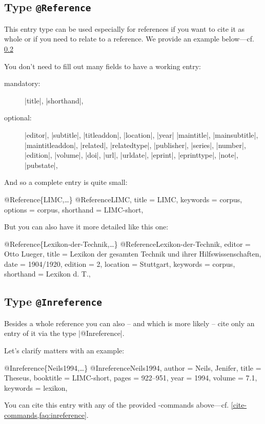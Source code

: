 \documentclass[a4paper,
10pt,
greek,
french,
spanish,
italian,
ngerman,
english
]{ltxdoc}
\begin{document}
 \subsection{Type \texttt{@Reference}}\label{reference}
 This entry type can be used especially for references if you want to cite it as whole or if you need to relate to a reference. 
We provide an example below---cf. \cref{inreference}

You don’t need to fill out many fields to have a working entry:
\begin{description}
\item[mandatory:] |title|, |shorthand|,
\item[optional:] 
 |editor|, |subtitle|, |titleaddon|,
 |location|, |year|
|maintitle|, |mainsubtitle|, |maintitleaddon|,
|related|, |relatedtype|,
|publisher|, |series|, |number|, |edition|, |volume|,
|doi|, |url|, |urldate|, |eprint|, |eprinttype|, |note|, |pubstate|, 
\end{description}

And so a complete entry is quite small:
\begin{bibexample}[label=LIMC]{{@}Reference\{LIMC,…\}}
@Reference{LIMC,
  title     = LIMC,
  keywords  = {corpus},
  options   = {corpus},
  shorthand = LIMC-short,
}
\end{bibexample}
 
But you can also have it  more detailed  like this one:
\begin{bibexample}[label=Lexikon-der-Technik]{{@}Reference\{Lexikon-der-Technik,…\}}
@Reference{Lexikon-der-Technik,
  editor    = {Otto Lueger},
  title     = {Lexikon der gesamten Technik und ihrer Hilfswissenschaften},
  date      = {1904/1920},
  edition   = {2},
  location  = Stuttgart,   %
  keywords  = {corpus},
  shorthand = {Lexikon d. T.},
}
\end{bibexample}

 \subsection{Type \texttt{@Inreference}}\label{inreference}
Besides a whole reference you can also -- and which is more likely -- cite only an entry of it via the type  |@Inreference|.

Let’s clarify matters with an example:
\begin{bibexample}[label=Neils1994]{{@}Inreference\{Neils1994,…\}}
@Inreference{Neils1994,
  author    = {Neils, Jenifer},
  title     = {Theseus},
  booktitle = LIMC-short,    %
  pages     = {922--951},
  year      = {1994},
  volume    = {7.1},
  keywords  = {lexikon},
}
\end{bibexample}
You can cite this entry with any of the provided -commands above---cf. \cref{cite-commands,faq:inreference}.
\end{document}
